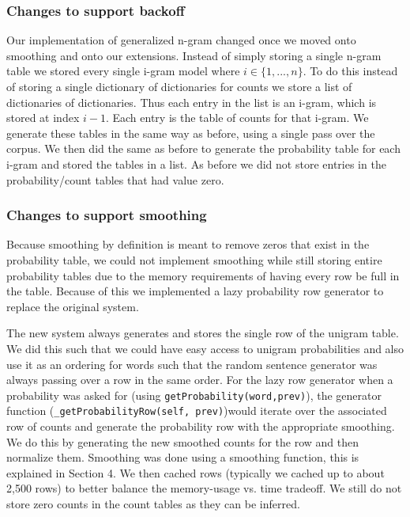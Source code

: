 \documentclass{article}
\begin{document}
\subsubsection{Changes to support backoff}
Our implementation of generalized n-gram changed once we moved onto smoothing and onto our extensions. Instead of simply storing a single n-gram table we stored every single i-gram model where $i\in \lbrace 1,...,n \rbrace$. To do this instead of storing a single dictionary of dictionaries for counts we store a list of dictionaries of dictionaries. Thus each entry in the list is an i-gram, which is stored at index $i-1$. Each entry is the table of counts for that i-gram. We generate these tables in the same way as before, using a single pass over the corpus. We then did the same as before to generate the probability table for each i-gram and stored the tables in a list. As before we did not store entries in the probability/count tables that had value zero.

\subsubsection{Changes to support smoothing}
Because smoothing by definition is meant to remove zeros that exist in the probability table, we could not implement smoothing while still storing entire probability tables due to the memory requirements of having every row be full in the table. Because of this we implemented a lazy probability row generator to replace the original system.

The new system always generates and stores the single row of the unigram table. We did this such that we could have easy access to unigram probabilities and also use it as an ordering for words such that the random sentence generator was always passing over a row in the same order. For the lazy row generator when a probability was asked for (using \texttt{getProbability(word,prev)}), the generator function (\texttt{\_getProbabilityRow(self, prev)})would iterate over the associated row of counts and generate the probability row with the appropriate smoothing. We do this by generating the new smoothed counts for the row and then normalize them. Smoothing was done using a smoothing function, this is explained in Section 4. We then cached rows (typically we cached up to about 2,500 rows) to better balance the memory-usage vs. time tradeoff. We still do not store zero counts in the count tables as they can be inferred.
\end{document}
